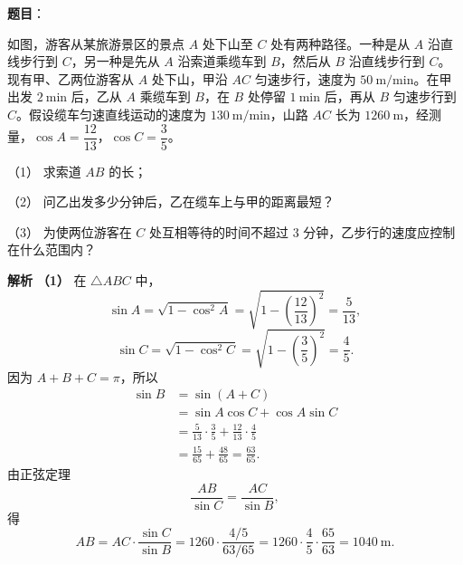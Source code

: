 \begin{answer}

\textbf{题目}：

如图，游客从某旅游景区的景点 $A$ 处下山至 $C$ 处有两种路径。一种是从 $A$ 沿直线步行到 $C$，另一种是先从 $A$ 沿索道乘缆车到 $B$，然后从 $B$ 沿直线步行到 $C$。现有甲、乙两位游客从 $A$ 处下山，甲沿 $AC$ 匀速步行，速度为 $50\ \mathrm{m/min}$。在甲出发 $2\ \mathrm{min}$ 后，乙从 $A$ 乘缆车到 $B$，在 $B$ 处停留 $1\ \mathrm{min}$ 后，再从 $B$ 匀速步行到 $C$。假设缆车匀速直线运动的速度为 $130\ \mathrm{m/min}$，山路 $AC$ 长为 $1260\ \mathrm{m}$，经测量，$\cos A=\dfrac{12}{13}$，$\cos C=\dfrac35$。

（1） 求索道 $AB$ 的长；

（2） 问乙出发多少分钟后，乙在缆车上与甲的距离最短？

（3） 为使两位游客在 $C$ 处互相等待的时间不超过 $3$ 分钟，乙步行的速度应控制在什么范围内？
\nopagebreak[4]
\begin{center}\end{center}
\nopagebreak[4]
\textbf{解析}
\textbf{（1）} 在 $\triangle ABC$ 中，
\nopagebreak[4]
\[\sin A=\sqrt{1-\cos^2A}=\sqrt{1-\left(\frac{12}{13}\right)^2}=\frac5{13},\]
\nopagebreak[4]
\[\sin C=\sqrt{1-\cos^2C}=\sqrt{1-\left(\frac35\right)^2}=\frac45.\]
因为 $A+B+C=\pi$，所以
\nopagebreak[4]
\[\begin{aligned}
\sin B&=\sin(A+C)\\
&=\sin A\cos C+\cos A\sin C\\
&=\frac5{13}\cdot\frac35+\frac{12}{13}\cdot\frac45\\
&=\frac{15}{65}+\frac{48}{65}=\frac{63}{65}.
\end{aligned}\]
由正弦定理
\nopagebreak[4]
\[\frac{AB}{\sin C}=\frac{AC}{\sin B},\]
得
\nopagebreak[4]
\[AB=AC\cdot\frac{\sin C}{\sin B}
=1260\cdot\frac{4/5}{63/65}
=1260\cdot\frac45\cdot\frac{65}{63}
=1040\ \mathrm m.\]


\end{answer}
